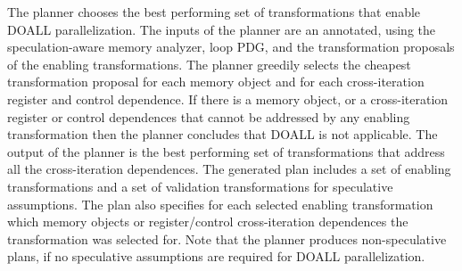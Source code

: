 The planner chooses the best performing set of transformations that
enable DOALL parallelization.
%
The inputs of the planner are an annotated, using the
speculation-aware memory analyzer, loop PDG, and the transformation
proposals of the enabling transformations.
%
%
%
The planner greedily selects the cheapest transformation proposal for
each memory object and for each cross-iteration register and control
dependence.
%
If there is a memory object, or a cross-iteration register or control
dependences that cannot be addressed by any enabling transformation
then the planner concludes that DOALL is not applicable.
%
%
The output of the planner is the best performing
set of transformations that address all the cross-iteration
dependences. 
%
%
The generated plan includes a set of enabling transformations and a
set of validation transformations for speculative assumptions.  The
plan also specifies for each selected enabling transformation which
memory objects or register/control cross-iteration dependences the
transformation was selected for.
%
Note that the planner produces non-speculative plans, if no
speculative assumptions are required for DOALL parallelization.
